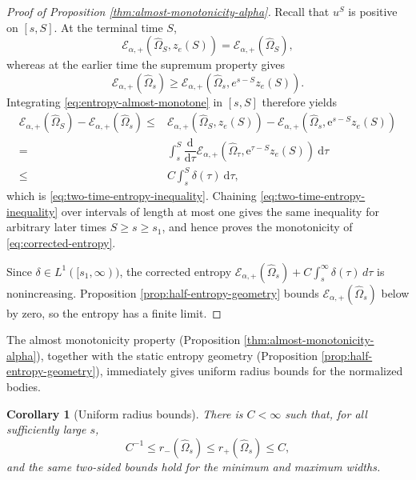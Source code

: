 \documentclass[11pt, reqno]{amsart}
\newtheorem{corollary}[theorem]{Corollary}
\theoremstyle{remark}
\theoremstyle{definition}
\numberwithin{equation}{section}
\newcommand{\cE}{\mathcal E}
\newcommand{\dd}{\,d}
\begin{document}
\begin{proof}[Proof of Proposition \ref{thm:almost-monotonicity-alpha}]
Recall that $u^S$ is positive on $[s,S]$. At the terminal time $S$,
\begin{equation*}
        \mathcal{E}_{\alpha,+}(\widehat\Omega_{S},z_e(S))
        =\mathcal{E}_{\alpha,+}(\widehat\Omega_{S}),
\end{equation*}
whereas at the earlier time the supremum property gives
\begin{equation*}
        \cE_{\alpha,+}(\widehat\Omega_{s})
        \ge
        \cE_{\alpha,+}(\widehat\Omega_{s},e^{s-S}z_e(S)).
\end{equation*}
Integrating \eqref{eq:entropy-almost-monotone} in $[s,S]$ therefore yields
\begin{align}
    \mathcal{E}_{\alpha,+}(\widehat{\Omega}_S)-\mathcal{E}_{\alpha,+}(\widehat{\Omega}_s) \leq & \mathcal{E}_{\alpha,+}(\widehat{\Omega}_S,z_e(S)) - \mathcal{E}_{\alpha,+}(\widehat{\Omega}_s,\mathrm{e}^{s-S}z_e(S)) \nonumber \\
    =& \int_s^S \dfrac{\mathrm{d}}{\mathrm{d}\tau} \mathcal{E}_{\alpha,+}(\widehat{\Omega}_{\tau},\mathrm{e}^{\tau-S}z_e(S)) ~\mathrm{d}\tau \nonumber \\
    \leq & C \int_s^S \delta(\tau)~\mathrm{d}\tau,  \label{equ-dentropy}
\end{align}
which is \eqref{eq:two-time-entropy-inequality}.  Chaining \eqref{eq:two-time-entropy-inequality} over intervals of length at most one gives the same inequality for arbitrary later times $S\ge s\ge s_1$, and hence proves the monotonicity of \eqref{eq:corrected-entropy}.

Since $\delta\in L^1([s_1,\infty))$, the corrected entropy $\cE_{\alpha,+}(\widehat{\Omega}_s)+C\int_s^{\infty}\delta(\tau)\dd\tau$ is nonincreasing.  Proposition \ref{prop:half-entropy-geometry} bounds $\mathcal{E}_{\alpha,+}(\widehat{\Omega}_s)$ below by zero, so the entropy has a finite limit.
\end{proof}


The almost monotonicity property (Proposition \ref{thm:almost-monotonicity-alpha}), together with the static entropy geometry (Proposition \ref{prop:half-entropy-geometry}), immediately gives uniform radius bounds for the normalized bodies.

\begin{corollary}[Uniform radius bounds]\label{cor:normalized-radius-bounds}
There is $C<\infty$ such that, for all sufficiently large $s$,
\begin{equation*}
        C^{-1}\le r_-(\widehat\Omega_s)
        \le r_+(\widehat\Omega_s)\le C,
\end{equation*}
and the same two-sided bounds hold for the minimum and maximum widths.
\end{corollary}
\end{document}
